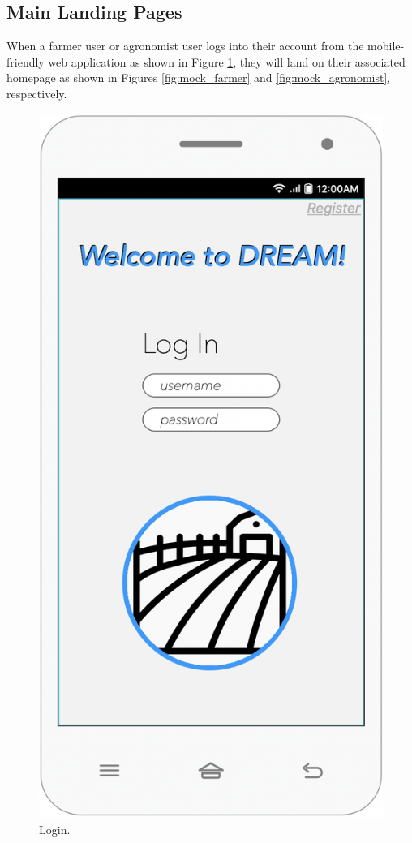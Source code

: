 \subsection{Main Landing Pages}
\begin{flushleft}
When a farmer user or agronomist user logs into their account from the mobile-friendly web application as shown in Figure \ref{fig:mock_login}, they will land on their associated homepage as shown in Figures \ref{fig:mock_farmer} and \ref{fig:mock_agronomist}, respectively. 
\end{flushleft}

\begin{multicols}{3}
\begin{figure}[H]
\centering
\includegraphics[scale=0.35]{../images_diagrams/mock_ups/login100.png}
\caption{\label{fig:mock_login}Login.}
\end{figure}


\end{multicols}
